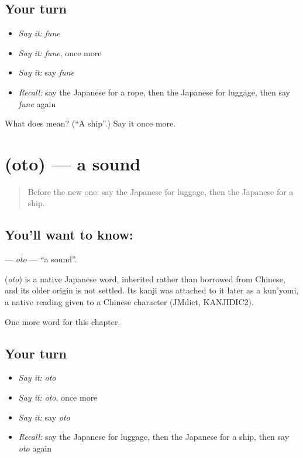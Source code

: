 \subsection*{Your turn}
\begin{itemize}
\raggedright
  \item \emph{Say it:} \emph{fune}
  \item \emph{Say it:} \emph{fune}, once more
  \item \emph{Say it:} say \emph{fune}
  \item \emph{Recall:} say the Japanese for a rope, then the Japanese for luggage, then say \emph{fune} again
\end{itemize}

\begin{tcolorbox}[breakable,colback=teal!4,colframe=teal!35!black,title={Before you move on}]
What does  mean? (\textquotedblleft{}A ship\textquotedblright{}.) Say it once more.
\end{tcolorbox}
\section[\texorpdfstring{\ja{おと} (oto)}{おと (oto)}]{ (oto) — a sound}

\label{lesson:JA-C62-oto}



\begin{quote}
Before the new one: say the Japanese for luggage, then the Japanese for a ship.
\end{quote}

\subsection*{You'll want to know: }
\textbf{} — \emph{oto} — \textquotedblleft{}a sound\textquotedblright{}.

\begin{cousinweb}
\textbf{} (\emph{oto}) is a native Japanese word, inherited rather than borrowed from Chinese, and its older origin is not settled. Its kanji was attached to it later as a kun'yomi, a native reading given to a Chinese character (JMdict, KANJIDIC2).
\end{cousinweb}

\begin{grammarlens}[title={What you've built}]
One more word for this chapter.
\end{grammarlens}

\subsection*{Your turn}
\begin{itemize}
\raggedright
  \item \emph{Say it:} \emph{oto}
  \item \emph{Say it:} \emph{oto}, once more
  \item \emph{Say it:} say \emph{oto}
  \item \emph{Recall:} say the Japanese for luggage, then the Japanese for a ship, then say \emph{oto} again
\end{itemize}

